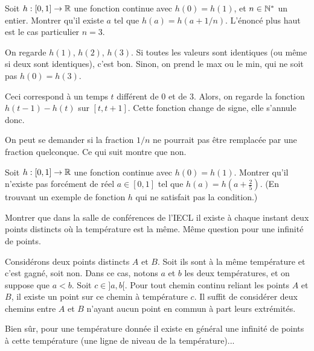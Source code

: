 \begin{exo}
Soit $h : [0,1]\to \mathbb R$ une fonction continue avec $h(0)=h(1)$, et $n\in \mathbb N^*$ un entier. Montrer qu'il existe $a$ tel que $h(a)=h(a+1/n)$. L'énoncé plus haut est le cas particulier $n=3$.

\begin{sol}
On regarde $h(1)$, $h(2)$, $h(3)$. Si toutes les valeurs sont identiques (ou même si deux sont identiques), c'est bon. Sinon, on prend le max ou le min, qui ne soit pas $h(0)=h(3)$.

Ceci correspond à un temps $t$ différent de $0$ et de $3$. Alors, on regarde la fonction $h(t-1)-h(t)$ sur $[t,t+1]$. Cette fonction change de signe, elle s'annule donc.

\begin{remarque}
On peut se demander si la fraction $1/n$ ne pourrait pas être remplacée par une fraction quelconque. Ce qui suit montre que non.

Soit $h : [0,1] \to \mathbb R$ une fonction continue avec $h(0)=h(1)$. Montrer qu'il n'existe pas forcément de réel $a\in [0,1]$ tel que $h(a)=h(a+\frac25)$. (En trouvant un exemple de fonction $h$ qui ne satisfait pas la condition.)
\end{remarque}
\end{sol}
\end{exo}






\begin{exo}
Montrer que dans la salle de conférences de l'IECL il existe à chaque instant deux points distincts où la température est la même. Même question pour une infinité de points.
\begin{sol}
Considérons deux points distincts $A$ et $B$. Soit ils sont à la même température et c'est gagné, soit non. Dans ce cas, notons $a$ et $b$ les deux températures, et on suppose que $a<b$. Soit $c\in ]a,b[$. Pour tout chemin continu reliant les points $A$ et $B$, il existe un point sur ce chemin à température $c$. Il suffit de considérer deux chemins entre $A$ et $B$ n'ayant aucun point en commun à part leurs extrémités.

Bien sûr, pour une température donnée il existe en général une infinité de points à cette température (une ligne de niveau de la température)...
\end{sol}
\end{exo}

